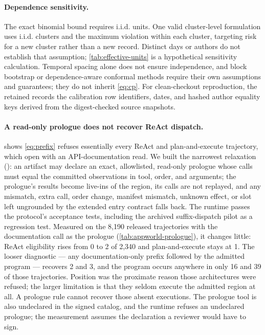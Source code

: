 \paragraph{Dependence sensitivity.}
The exact binomial bound requires i.i.d. units. One valid cluster-level
formulation uses i.i.d. clusters and the maximum violation within each cluster,
targeting risk for a new cluster rather than a new record. Distinct days or
authors do not establish that assumption; \cref{tab:effective-units} is a
hypothetical sensitivity calculation. Temporal spacing alone does not ensure
independence, and block bootstrap or dependence-aware conformal methods require
their own assumptions and guarantees; they do not inherit \cref{eq:cp}.
For clean-checkout reproduction, the retained
 records the
calibration row identifiers, dates, and hashed author equality keys derived
from the digest-checked source snapshots.

\begin{table}[t]
  \centering
  \caption{Distinct grouping units in the 92-record calibration cohorts,
  joined to the pinned snapshot: distinct creation days, months, and authors,
  and the zero-violation bound the registered budget would give if each cluster
  were one unit (admits only when the count is at least 92).}
  \label{tab:effective-units}
  \footnotesize
  \setlength{\tabcolsep}{4pt}
  
\end{table}

\paragraph{A read-only prologue does not recover ReAct dispatch.}
 shows \cref{eq:prefix} refuses essentially every ReAct
and plan-and-execute trajectory, which open with an API-documentation read. We
built the narrowest relaxation
(): an artifact may
declare an exact, allowlisted, read-only prologue whose calls must equal the
committed observations in tool, order, and arguments; the prologue's results
become live-ins of the region, its calls are not replayed, and any mismatch,
extra call, order change, manifest mismatch, unknown effect, or slot left
ungrounded by the extended entry contract falls back. The runtime passes the
protocol's acceptance tests, including the archived suffix-dispatch pilot as a
regression test. Measured on the 8{,}190 released trajectories with the
documentation call as the prologue (\cref{tab:appworld-prologue}), it changes little: ReAct eligibility rises from 0 to 2 of 2{,}340 and plan-and-execute
stays at 1. The looser diagnostic --- any documentation-only prefix followed by
the admitted program --- recovers 2 and 3, and the program occurs anywhere in
only 16 and 39 of those trajectories. Position was the proximate reason those
architectures were refused; the larger limitation is that they seldom execute the
admitted region at all. A prologue rule cannot recover those absent executions. The prologue tool
is also undeclared in the signed catalog, and the runtime refuses an undeclared
prologue; the measurement assumes the declaration a reviewer would have to sign.

